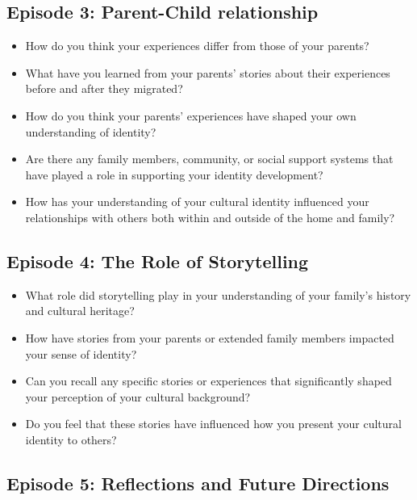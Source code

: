 \subsection{Episode 3: Parent-Child relationship}

\begin{itemize}
    \item How do you think your experiences differ from those of your parents?
    \item What have you learned from your parents' stories about their experiences before and after they migrated?
    \item How do you think your parents’ experiences have shaped your own understanding of identity?
    \item Are there any family members, community, or social support systems that have played a role in supporting your identity development?
    \item How has your understanding of your cultural identity influenced your relationships with others both within and outside of the home and family?

\end{itemize}

\subsection{Episode 4: The Role of Storytelling}

\begin{itemize}
    \item What role did storytelling play in your understanding of your family’s history and cultural heritage?
    \item How have stories from your parents or extended family members impacted your sense of identity?
    \item Can you recall any specific stories or experiences that significantly shaped your perception of your cultural background?
    \item Do you feel that these stories have influenced how you present your cultural identity to others?

\end{itemize}

\subsection{Episode 5: Reflections and Future Directions}

